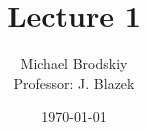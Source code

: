 


\title{Lecture 1}
\date{\today}
\author{Michael Brodskiy\\ \small Professor: J. Blazek}



\maketitle

